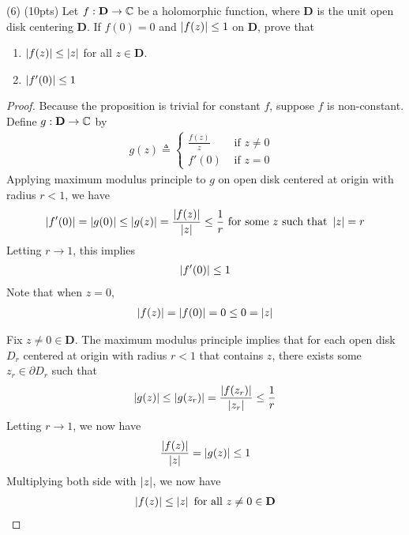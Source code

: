 \documentclass{report}
\begin{document}
\begin{question}{}{}
  (6) (10pts) Let $f:\textbf{D}\rightarrow \mathbb{C}$ be a holomorphic function, where $\textbf{D}$ is the unit open disk centering $\textbf{D}$. If  $f(0)=0$ and $\left|f(z)\right|\leq 1$ on $\textbf{D}$, prove that 
   \begin{enumerate}[label=(\alph*)]
    \item $\left|f(z)\right|\leq \left|z\right|$ for all $z\in \textbf{D}$. 
    \item $\left|f'(0)\right|\leq 1$
  \end{enumerate}
\end{question}
\begin{proof}
Because the proposition is trivial for constant $f$, suppose $f$ is non-constant. Define $g:\textbf{D}\rightarrow \mathbb{C}$ by 
\begin{align*}
g(z)\triangleq \begin{cases}
  \frac{f(z)}{z}& \text{ if $z\neq 0$ }\\
  f'(0)& \text{ if $z=0$ }
\end{cases}
\end{align*}
Applying maximum modulus principle to $g$ on open disk centered at origin with radius  $r<1$, we have 
\begin{align*}
\left|f'(0)\right|=\left|g(0)\right|\leq \left|g(z)\right|= \frac{\left|f(z)\right|}{\left|z\right|}\leq \frac{1}{r}\text{ for some }z\text{ such that }\left|z\right|=r
\end{align*}
Letting $r\to 1$, this implies 
\begin{align*}
\left|f'(0)\right|\leq 1
\end{align*}
Note that when $z=0$, 
 \begin{align*}
\left|f(z)\right|=\left|f(0)\right|=0 \leq 0= \left|z\right|
\end{align*}



Fix $z\neq 0 \in \textbf{D}$. The maximum modulus principle implies that for each open disk $D_r$ centered at origin with radius  $r<1$ that contains $z$, there exists some $z_r\in \partial D_r$ such that 
 \begin{align*}
\left|g(z)\right| \leq \left|g(z_r)\right|= \frac{\left|f(z_r)\right|}{\left|z_r\right|} \leq \frac{1}{r}
\end{align*}
Letting $r\to 1$, we now have  
\begin{align*}
\frac{\left|f(z)\right|}{\left|z\right|}=\left|g(z)\right|\leq 1
\end{align*}
Multiplying both side with $\left|z\right|$, we now have 
\begin{align*}
\left|f(z)\right|\leq \left|z\right|\text{ for all }z\neq 0 \in \textbf{D}
\end{align*}
\end{proof}
\end{document}

